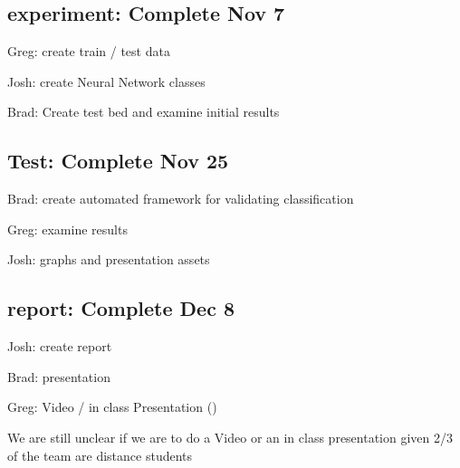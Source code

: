 \documentclass{article}
\begin{document}
\subsection{experiment: Complete Nov 7}
Greg: create train / test data

Josh: create Neural Network classes

Brad: Create test bed and examine initial results

\subsection{Test: Complete Nov 25}
Brad: create automated framework for validating classification

Greg: examine results

Josh: graphs and presentation assets

\subsection{report: Complete Dec 8}
Josh: create report

Brad: presentation

Greg: Video / in class Presentation ()

We are still unclear if we are to do a Video or an in class presentation given 2/3 of the team are distance students


\nocite{*}


\end{document}
